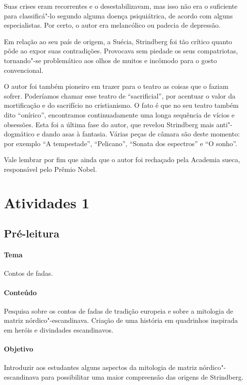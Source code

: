 \documentclass[12pt]{extarticle}
\begin{document}
Suas crises eram recorrentes e o desestabilizavam, mas isso não era o suficiente para classificá"-lo 
segundo alguma doença psiquiátrica, de acordo com alguns especialistas. 
Por certo, o autor era melancólico ou padecia de depressão.

Em relação ao seu país de origem, a Suécia, Strindberg foi tão 
crítico quanto pôde ao expor suas contradições.
Provocava sem piedade os seus compatriotas, tornando"-se problemático aos olhos de muitos e incômodo para o gosto convencional.

O autor foi também pioneiro em trazer para o teatro as coisas que o faziam sofrer. Poderíamos chamar esse teatro de ``sacrificial'', por acentuar o valor da mortificação e do sacrifício no cristianismo. 
O fato é que no seu teatro também dito ``onírico'', encontramos continuadamente uma longa sequência 
de vícios e obsessões. Esta foi a última fase do autor, que revelou Strindberg mais anti"-dogmático e dando asas à fantasia. Várias peças de câmara são deste momento: por exemplo ``A tempestade'', ``Pelicano'', ``Sonata dos espectros'' e ``O sonho''.


Vale lembrar por fim que ainda que o autor foi rechaçado pela Academia sueca, responsável pelo Prêmio Nobel.



\section{Atividades 1}


\subsection{Pré-leitura}

\paragraph{Tema} Contos de fadas.

\paragraph{Conteúdo} Pesquisa sobre os contos de fadas de tradição europeia e sobre a mitologia de matriz nórdico"-escandinava. Criação de uma história em quadrinhos inspirada em heróis e divindades escandinavos.

\paragraph{Objetivo} Introduzir aos estudantes alguns aspectos da mitologia de matriz nórdico"-escandinava para possibilitar uma maior compreensão das origens de Strindberg.
\end{document}
